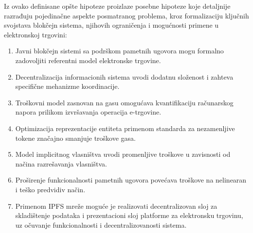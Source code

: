 Iz ovako definisane opšte hipoteze proizlaze posebne hipoteze koje detaljnije razrađuju pojedinačne aspekte posmatranog problema, kroz formalizaciju ključnih svojstava blokčejn sistema, njihovih ograničenja i mogućnosti primene u elektronskoj trgovini:
\begin{enumerate}
\item Javni blokčejn sistemi sa podrškom pametnih ugovora mogu formalno zadovoljiti referentni model elektronske trgovine.
\item Decentralizacija informacionih sistema uvodi dodatnu složenost i zahteva specifične mehanizme koordinacije.
\item Troškovni model zasnovan na gasu omogućava kvantifikaciju računarskog napora prilikom izvršavanja operacija e-trgovine.
\item Optimizacija reprezentacije entiteta primenom standarda za nezamenljive tokene značajno smanjuje troškove gasa.
\item Model implicitnog vlasništva uvodi promenljive troškove u zavisnosti od načina razrešavanja vlasništva.
\item Proširenje funkcionalnosti pametnih ugovora povećava troškove na nelinearan i teško predvidiv način.
\item Primenom IPFS mreže moguće je realizovati decentralizovan sloj za skladištenje podataka i prezentacioni sloj platforme za elektronsku trgovinu, uz očuvanje funkcionalnosti i decentralizovanosti sistema.
\end{enumerate}

